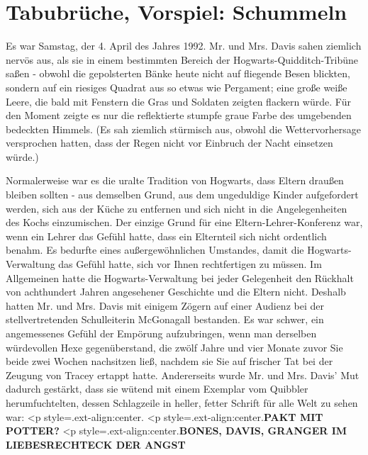\chapter{Tabubrüche, Vorspiel: Schummeln}

Es war Samstag, der 4. April des Jahres 1992. Mr. und Mrs. Davis sahen ziemlich
nervös aus, als sie in einem bestimmten Bereich der Hogwarts-Quidditch-Tribüne
saßen - obwohl die gepolsterten Bänke heute nicht auf fliegende Besen blickten,
sondern auf ein riesiges Quadrat aus so etwas wie Pergament; eine große weiße
Leere, die bald mit Fenstern die Gras und Soldaten zeigten flackern würde. Für
den Moment zeigte es nur die reflektierte stumpfe graue Farbe des umgebenden
bedeckten Himmels. (Es sah ziemlich stürmisch aus, obwohl die Wettervorhersage
versprochen hatten, dass der Regen nicht vor Einbruch der Nacht einsetzen
würde.)

Normalerweise war es die uralte Tradition von Hogwarts, dass Eltern draußen
bleiben sollten - aus demselben Grund, aus dem ungeduldige Kinder aufgefordert
werden, sich aus der Küche zu entfernen und sich nicht in die Angelegenheiten
des Kochs einzumischen. Der einzige Grund für eine Eltern-Lehrer-Konferenz war,
wenn ein Lehrer das Gefühl hatte, dass ein Elternteil sich nicht ordentlich
benahm. Es bedurfte eines außergewöhnlichen Umstandes, damit die
Hogwarts-Verwaltung das Gefühl hatte, sich vor Ihnen rechtfertigen zu müssen. Im
Allgemeinen hatte die Hogwarts-Verwaltung bei jeder Gelegenheit den Rückhalt von
achthundert Jahren angesehener Geschichte und die Eltern nicht. Deshalb hatten
Mr. und Mrs. Davis mit einigem Zögern auf einer Audienz bei der
stellvertretenden Schulleiterin McGonagall bestanden. Es war schwer, ein
angemessenes Gefühl der Empörung aufzubringen, wenn man derselben würdevollen
Hexe gegenüberstand, die zwölf Jahre und vier Monate zuvor Sie beide zwei Wochen
nachsitzen ließ, nachdem sie Sie auf frischer Tat bei der Zeugung von Tracey
ertappt hatte. Andererseits wurde Mr. und Mrs. Davis' Mut dadurch gestärkt, dass
sie wütend mit einem Exemplar vom Quibbler herumfuchtelten, dessen Schlagzeile
in heller, fetter Schrift für alle Welt zu sehen war: <p
style=\grqq{}.ext-align:center\grqq{}.  <p
style=\grqq{}.ext-align:center\grqq{}.\textbf{PAKT MIT POTTER?}   <p
style=\grqq{}.ext-align:center\grqq{}.\textbf{BONES, DAVIS, GRANGER IM
LIEBESRECHTECK DER ANGST}

